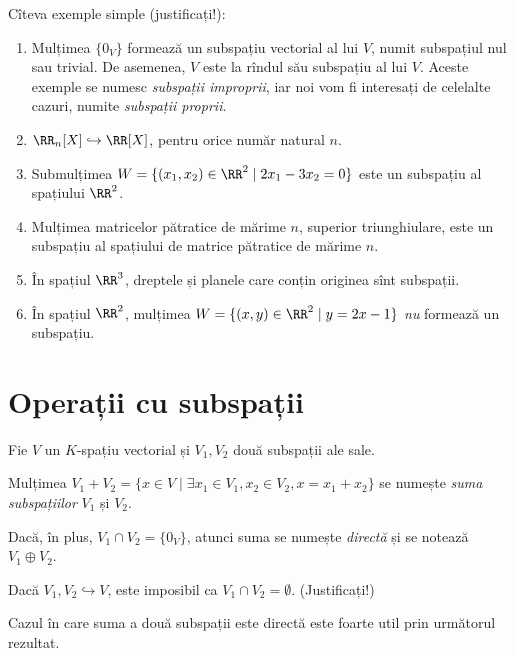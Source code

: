 Cîteva exemple simple (justificați!):
\begin{enumerate}
\item Mulțimea $ \{ 0_V \} $ formează un subspațiu vectorial al lui $ V $,
  numit subspațiul nul sau trivial. De asemenea, $ V $ este la rîndul
  său subspațiu al lui $ V $. Aceste exemple se numesc \emph{subspații improprii},
  iar noi vom fi interesați de celelalte cazuri, numite \emph{subspații proprii}.
\item $ \RR_n[X] \hookrightarrow \RR[X] $, pentru orice număr natural $ n $.
\item Submulțimea $ W = \{ (x_1, x_2) \in \RR^2 \mid 2x_1 - 3x_2 = 0 \} $ este
  un subspațiu al spațiului $ \RR^2 $.
\item Mulțimea matricelor pătratice de mărime $ n $, superior triunghiulare,
  este un subspațiu al spațiului de matrice pătratice de mărime $ n $.
\item În spațiul $ \RR^3 $, dreptele și planele care conțin originea sînt subspații.
\item În spațiul $ \RR^2 $, mulțimea $ W = \{ (x, y) \in \RR^2 \mid y = 2x - 1 \} $
  \emph{nu} formează un subspațiu.
\end{enumerate}


\section{Operații cu subspații}

Fie $ V $ un $ K $-spațiu vectorial și $ V_1, V_2 $ două subspații ale sale.

\begin{definition}\label{def:suma-sp}
  Mulțimea $ V_1 + V_2 = \{ x \in V \mid \exists x_1 \in V_1, x_2 \in V_2, x = x_1 + x_2 \} $
  se numește \emph{suma subspațiilor} $ V_1 $ și $ V_2 $.

  Dacă, în plus, $ V_1 \cap V_2 = \{ 0_V \} $, atunci suma se numește \emph{directă}
  și se notează $ V_1 \oplus V_2 $.
\end{definition}

\begin{remark}\label{rk:inters-subsp}
  Dacă $ V_1, V_2 \hookrightarrow V $, este imposibil ca $ V_1 \cap V_2 = \emptyset $. (Justificați!)
\end{remark}

Cazul în care suma a două subspații este directă este foarte util prin următorul rezultat.

